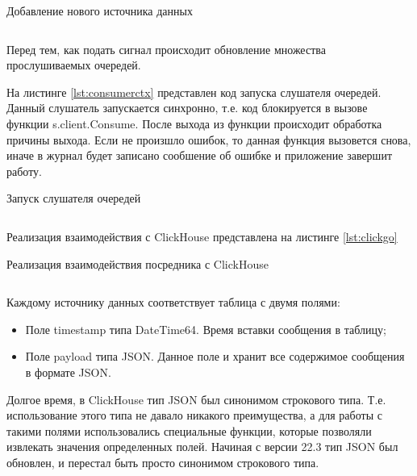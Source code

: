 \documentclass[14pt, russian]{scrartcl}
\begin{document}
\begin{listing}[H]
	\caption{Добавление нового источника данных}
	\label{lst:ctxclosing}
	\inputminted[style=bw, frame=single,fontsize = \footnotesize, linenos=false, xleftmargin = 1.5em]{shell}{./listings/contextclose.go}
\end{listing}

Перед тем, как подать сигнал происходит обновление множества
прослушиваемых очередей.

На листинге \ref{lst:consumerctx} представлен код запуска слушателя очередей.
Данный слушатель запускается синхронно, т.е. код блокируется в 
вызове функции s.client.Consume. После выхода 
из функции происходит обработка причины выхода. Если 
не произшло ошибок, то данная функция вызовется снова, иначе
в журнал будет записано сообшение об ошибке и приложение завершит работу.

\begin{listing}[H]
	\caption{Запуск слушателя очередей}
	\label{lst:consumerctx}
	\inputminted[style=bw, frame=single,fontsize = \footnotesize, linenos=false, xleftmargin = 1.5em]{shell}{./listings/consumerctx.go}
\end{listing}


Реализация взаимодействия с ClickHouse представлена на листинге \ref{lst:clickgo} 

\begin{listing}[H]
	\caption{Реализация взаимодействия посредника с ClickHouse}
	\label{lst:clickgo}
	\inputminted[breaklines=true, style=bw, frame=single,fontsize = \footnotesize, linenos=false, xleftmargin = 1.5em]{golang}{./listings/clickgo.go}
\end{listing}

Каждому источнику данных соответствует таблица с двумя полями:

\begin{itemize}
  \item Поле timestamp типа DateTime64. Время вставки сообщения в таблицу;
  \item Поле payload типа JSON. Данное поле и хранит все содержимое сообщения в формате JSON.
\end{itemize}

Долгое время, в ClickHouse тип JSON был синонимом строкового типа. Т.е. использование этого типа 
не давало никакого преимущества, а для работы с такими полями использовались специальные функции, которые 
позволяли извлекать значения определенных полей.
Начиная с версии 22.3 тип JSON был обновлен, и перестал быть просто синонимом строкового типа.
\end{document}
